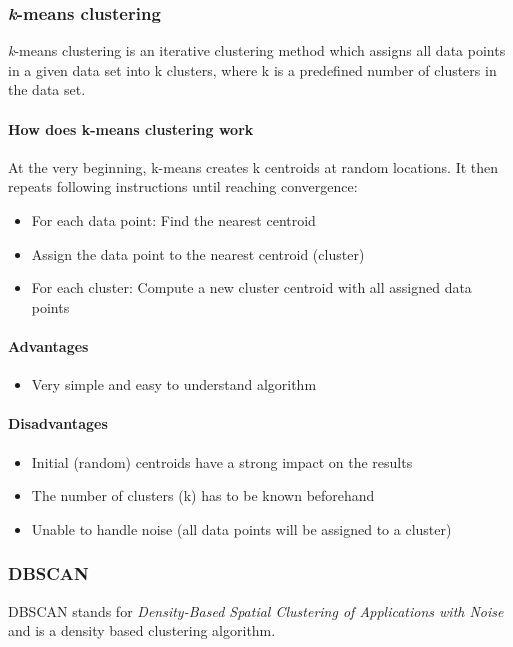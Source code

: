 
\subsubsection{\textit{k}-means clustering}
\textit{k}-means clustering is an iterative clustering method which assigns all data points in a given data set
into k clusters, where k is a predefined number of clusters in the data set.

\paragraph{How does k-means clustering work}
At the very beginning, k-means creates k centroids at random locations.
It then repeats following instructions until reaching convergence:

\begin{itemize}
    \item For each data point: Find the nearest centroid
    \item Assign the data point to the nearest centroid (cluster)
    \item For each cluster: Compute a new cluster centroid with all assigned data points
\end{itemize}

\paragraph{Advantages}
\begin{itemize}
    \item Very simple and easy to understand algorithm
\end{itemize}

\paragraph{Disadvantages}
\begin{itemize}
    \item Initial (random) centroids have a strong impact on the results
    \item The number of clusters (k) has to be known beforehand
    \item Unable to handle noise (all data points will be assigned to a cluster)
\end{itemize}

\subsubsection{DBSCAN}
DBSCAN stands for \textit{Density-Based Spatial Clustering of Applications with Noise}
and is a density based clustering algorithm.

